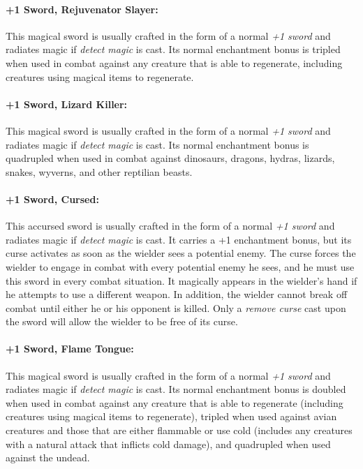 \begin{multicols}{2}
\paragraph{+1 Sword, Rejuvenator Slayer:} This magical sword is usually crafted in the form of a normal \textit{+1 sword} and radiates magic if \textit{detect magic} is cast.  Its normal enchantment bonus is tripled when used in combat against any creature that is able to regenerate, including creatures using magical items to regenerate.

\paragraph{+1 Sword, Lizard Killer:} This magical sword is usually crafted in the form of a normal \textit{+1 sword} and radiates magic if \textit{detect magic} is cast.  Its normal enchantment bonus is quadrupled when used in combat against dinosaurs, dragons, hydras, lizards, snakes, wyverns, and other reptilian beasts.

\paragraph{+1 Sword, Cursed:} This accursed sword is usually crafted in the form of a normal \textit{+1 sword} and radiates magic if \textit{detect magic} is cast.  It carries a +1 enchantment bonus, but its curse activates as soon as the wielder sees a potential enemy.  The curse forces the wielder to engage in combat with every potential enemy he sees, and he must use this sword in every combat situation.  It magically appears in the wielder's hand if he attempts to use a different weapon.  In addition, the wielder cannot break off combat until either he or his opponent is killed.  Only a \textit{remove curse} cast upon the sword will allow the wielder to be free of its curse.
 
\paragraph{+1 Sword, Flame Tongue:} This magical sword is usually crafted in the form of a normal \textit{+1 sword} and radiates magic if \textit{detect magic} is cast.  Its normal enchantment bonus is doubled when used in combat against any creature that is able to regenerate (including creatures using magical items to regenerate), tripled when used against avian creatures and those that are either flammable or use cold (includes any creatures with a natural attack that inflicts cold damage), and quadrupled when used against the undead.


\end{multicols}
